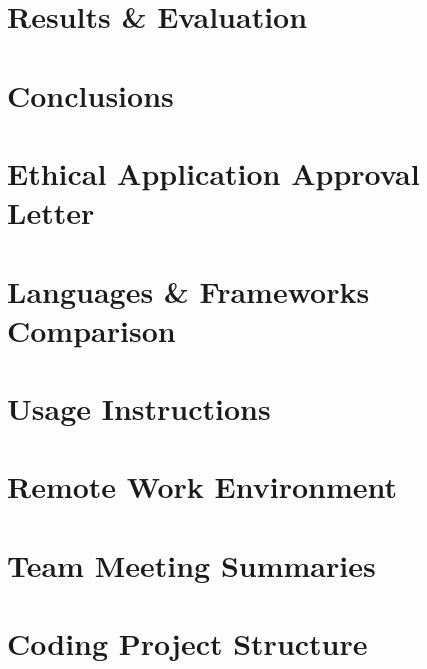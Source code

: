 \documentclass[11pt,oneside,a4paper]{report} %
\begin{document}
\chapter{Results \& Evaluation}
\label{ch:chapter-evaluation}


\chapter{Conclusions}
\label{ch:chapter-conclusions}




\appendix

\chapter{Ethical Application Approval Letter}
\label{ch:appendix-ethical-approval-letter}


\chapter{Languages \& Frameworks Comparison}


\chapter{Usage Instructions}
\label{ch:appendix-usage-instructions}


\chapter{Remote Work Environment}
\label{ch:appendix-remote-work-environment}


\chapter{Team Meeting Summaries}
\label{ch:appendix-team-meeting-summaries}


\chapter{Coding Project Structure}
\label{ch:appendix-coding-project-structure}

\end{document}
